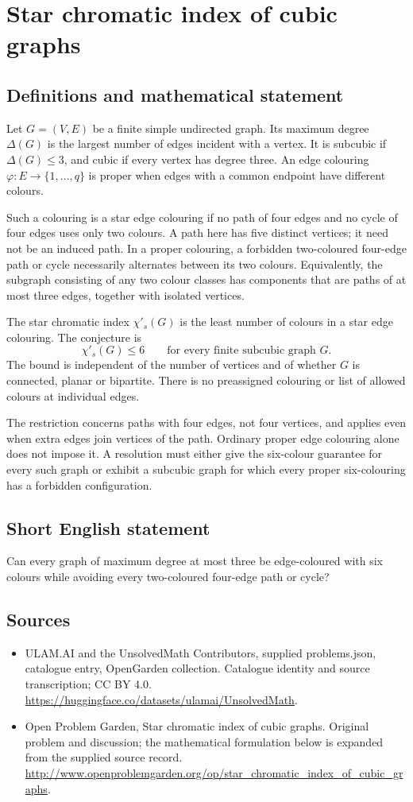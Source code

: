 \documentclass[11pt,a4paper]{article}
\begin{document}
\section*{Star chromatic index of cubic graphs}\label{statement}

\subsection{Definitions and mathematical statement}
Let $G=(V,E)$ be a finite simple undirected graph. Its maximum degree
$\Delta(G)$ is the largest number of edges incident with a vertex.
It is subcubic if $\Delta(G)\le3$, and cubic if every vertex has degree
three. An edge colouring $\varphi:E\to\{1,\ldots,q\}$ is proper when
edges with a common endpoint have different colours.

Such a colouring is a star edge colouring if no path of four edges and
no cycle of four edges uses only two colours. A path here has five
distinct vertices; it need not be an induced path. In a proper colouring,
a forbidden two-coloured four-edge path or cycle necessarily alternates
between its two colours. Equivalently, the subgraph consisting of any
two colour classes has components that are paths of at most three edges,
together with isolated vertices.

The star chromatic index $\chi'_s(G)$ is the least number of colours
in a star edge colouring. The conjecture is
\[
 \chi'_s(G)\le6\qquad\text{for every finite subcubic graph }G.
\]
The bound is independent of the number of vertices and of whether $G$
is connected, planar or bipartite. There is no preassigned colouring or
list of allowed colours at individual edges.

The restriction concerns paths with four edges, not four vertices, and
applies even when extra edges join vertices of the path. Ordinary proper
edge colouring alone does not impose it. A resolution must either give
the six-colour guarantee for every such graph or exhibit a subcubic
graph for which every proper six-colouring has a forbidden configuration.
\subsection{Short English statement}
Can every graph of maximum degree at most three be edge-coloured with six colours while avoiding every two-coloured four-edge path or cycle?
\subsection{Sources}
\begin{itemize}
\item[S1] ULAM.AI and the UnsolvedMath Contributors, supplied problems.json, catalogue entry, OpenGarden collection. Catalogue identity and source transcription; CC BY 4.0.
\url{https://huggingface.co/datasets/ulamai/UnsolvedMath}.
\item[S2] Open Problem Garden, Star chromatic index of cubic graphs. Original problem and discussion; the mathematical formulation below is expanded from the supplied source record.
\url{http://www.openproblemgarden.org/op/star_chromatic_index_of_cubic_graphs}.
\end{itemize}
\end{document}

